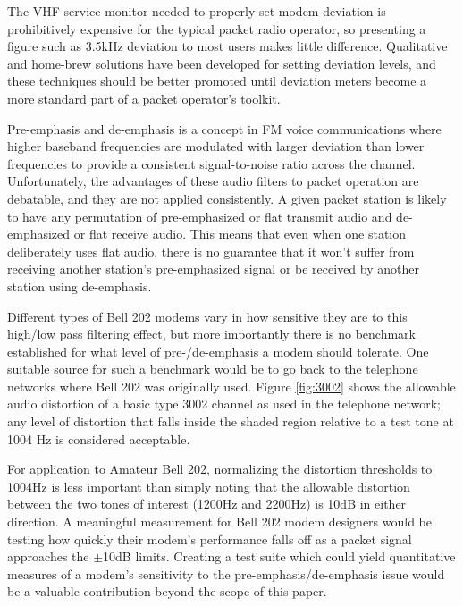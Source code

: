 \documentclass[12pt,letterpaper]{article}
\begin{document}
The VHF service monitor needed to properly set modem deviation is prohibitively
expensive for the typical packet radio operator, so presenting a figure 
such as 3.5kHz deviation to most users makes little difference.
Qualitative and home-brew solutions have been developed
for setting deviation levels\cite{n8urdev},
and these techniques should be better promoted until 
deviation meters become a more standard part of a packet operator's toolkit. 

Pre-emphasis and de-emphasis is a concept in FM voice communications where
higher baseband frequencies are modulated with larger deviation 
than lower frequencies
to provide a consistent signal-to-noise ratio across the channel.
Unfortunately, the advantages of these audio filters to packet operation 
are debatable, and they are not applied consistently. A given packet 
station is likely to have any permutation of pre-emphasized or flat 
transmit audio and de-emphasized or flat receive audio.
This means that even when one station deliberately uses flat audio,
there is no guarantee that it won't suffer from receiving another
station's pre-emphasized signal or be received by another station using de-emphasis.

Different types of Bell 202 modems vary in how sensitive they are to this high/low
pass filtering effect, but more importantly there is no benchmark established
for what level of pre-/de-emphasis a modem should tolerate.
One suitable source for such a benchmark would be to go back to the
telephone networks where Bell 202 was originally used.
Figure \ref{fig:3002} shows the allowable audio distortion of a basic type 3002
channel as used in the telephone network; any level of distortion that falls 
inside the shaded region relative to a test tone at 1004 Hz is considered acceptable.

For application to Amateur Bell 202, 
normalizing the distortion thresholds to 1004Hz is 
less important than simply noting that the allowable distortion between the two
tones of interest (1200Hz and 2200Hz) is 10dB in either direction.
A meaningful measurement for Bell 202 modem designers would be testing how
quickly their modem's performance falls off as a packet signal approaches 
the $\pm$10dB limits.
Creating a test suite which could yield quantitative
measures of a modem's sensitivity to the pre-emphasis/de-emphasis issue would
be a valuable contribution beyond the scope of this paper.
\end{document}
